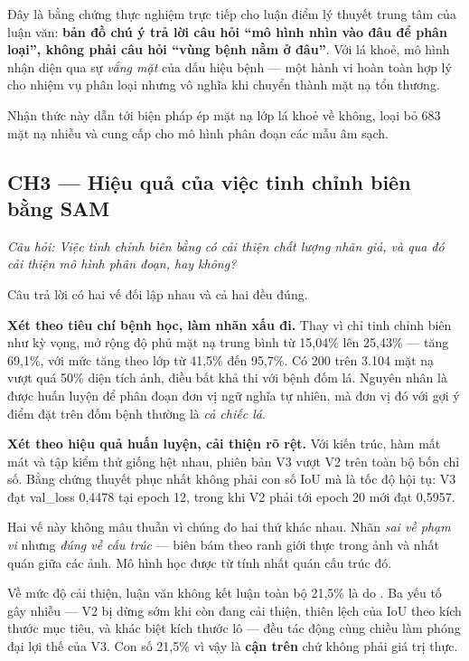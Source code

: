 Đây là bằng chứng thực nghiệm trực tiếp cho luận điểm lý thuyết trung tâm của luận
văn: \textbf{bản đồ chú ý trả lời câu hỏi ``mô hình nhìn vào đâu để phân loại'',
không phải câu hỏi ``vùng bệnh nằm ở đâu''}. Với lá khoẻ, mô hình nhận diện qua sự
\emph{vắng mặt} của dấu hiệu bệnh --- một hành vi hoàn toàn hợp lý cho nhiệm vụ
phân loại nhưng vô nghĩa khi chuyển thành mặt nạ tổn thương.

Nhận thức này dẫn tới biện pháp ép mặt nạ lớp lá khoẻ về không, loại bỏ 683 mặt nạ
nhiễu và cung cấp cho mô hình phân đoạn các mẫu âm sạch.

\subsection{CH3 --- Hiệu quả của việc tinh chỉnh biên bằng SAM}

\emph{Câu hỏi: Việc tinh chỉnh biên bằng \SAM{} có cải thiện chất lượng nhãn giả,
và qua đó cải thiện mô hình phân đoạn, hay không?}

Câu trả lời có hai vế đối lập nhau và cả hai đều đúng.

\textbf{Xét theo tiêu chí bệnh học, \SAM{} làm nhãn xấu đi.} Thay vì chỉ tinh chỉnh
biên như kỳ vọng, \SAM{} mở rộng độ phủ mặt nạ trung bình từ 15,04\% lên 25,43\%
--- tăng 69,1\%, với mức tăng theo lớp từ 41,5\% đến 95,7\%. Có 200 trên 3.104 mặt
nạ vượt quá 50\% diện tích ảnh, điều bất khả thi với bệnh đốm lá. Nguyên nhân là
\SAM{} được huấn luyện để phân đoạn đơn vị ngữ nghĩa tự nhiên, mà đơn vị đó với
gợi ý điểm đặt trên đốm bệnh thường là \emph{cả chiếc lá}.

\textbf{Xét theo hiệu quả huấn luyện, \SAM{} cải thiện rõ rệt.} Với kiến trúc, hàm
mất mát và tập kiểm thử giống hệt nhau, phiên bản V3 vượt V2 trên toàn bộ bốn chỉ
số. Bằng chứng thuyết phục nhất không phải con số IoU mà là tốc độ hội tụ: V3 đạt
val\_loss 0,4478 tại epoch 12, trong khi V2 phải tới epoch 20 mới đạt 0,5957.

Hai vế này không mâu thuẫn vì chúng đo hai thứ khác nhau. Nhãn \SAM{} \emph{sai về
phạm vi} nhưng \emph{đúng về cấu trúc} --- biên bám theo ranh giới thực trong ảnh
và nhất quán giữa các ảnh. Mô hình học được từ tính nhất quán cấu trúc đó.

Về mức độ cải thiện, luận văn không kết luận toàn bộ 21,5\% là do \SAM{}. Ba yếu
tố gây nhiễu --- V2 bị dừng sớm khi còn đang cải thiện, thiên lệch của IoU theo
kích thước mục tiêu, và khác biệt kích thước lô --- đều tác động cùng chiều làm
phóng đại lợi thế của V3. Con số 21,5\% vì vậy là \textbf{cận trên} chứ không phải
giá trị thực.

